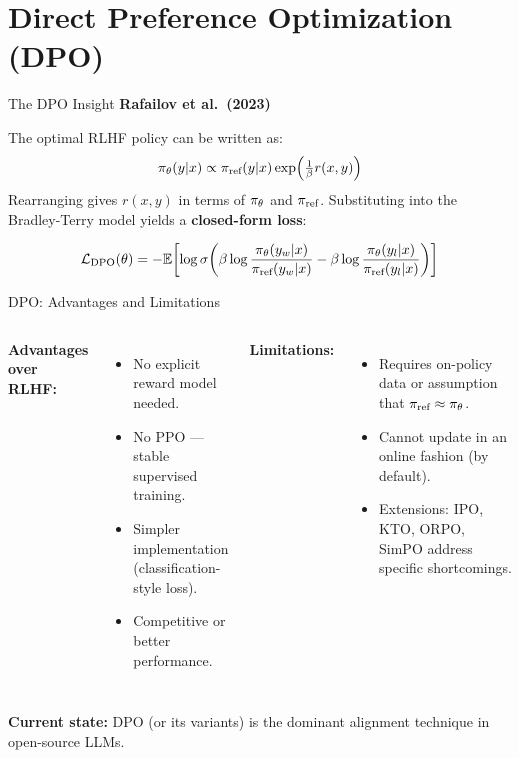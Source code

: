 \documentclass[aspectratio=169,10pt]{beamer}
\begin{document}
\section{Direct Preference Optimization (DPO)}

\begin{frame}{The DPO Insight}
  \textbf{Rafailov et al.\ (2023)}~\cite{rafailov2023direct}
  \vspace{0.4em}
  \begin{tcolorbox}[hitbox, title=Key Insight]
    The optimal RLHF policy can be written as:
    \[
      \pi_\theta(y|x) \propto \pi_{\text{ref}}(y|x)\exp\!\left(\tfrac{1}{\beta}r(x,y)\right)
    \]
    Rearranging gives $r(x,y)$ in terms of $\pi_\theta$ and $\pi_{\text{ref}}$.
    Substituting into the Bradley-Terry model yields a \textbf{closed-form loss}:
  \end{tcolorbox}
  \vspace{0.3em}
  \begin{tcolorbox}[hitbox, title=DPO Loss]
    \[
      \mathcal{L}_{\mathrm{DPO}}(\theta) = -\mathbb{E}\!\left[
        \log \sigma\!\left(
          \beta\log\frac{\pi_\theta(y_w|x)}{\pi_{\text{ref}}(y_w|x)}
          - \beta\log\frac{\pi_\theta(y_l|x)}{\pi_{\text{ref}}(y_l|x)}
        \right)
      \right]
    \]
  \end{tcolorbox}
\end{frame}

\begin{frame}{DPO: Advantages and Limitations}
  \begin{columns}[T]
      \textbf{Advantages over RLHF:}
      \begin{itemize}
        \item No explicit reward model needed.
        \item No PPO — stable supervised training.
        \item Simpler implementation (classification-style loss).
        \item Competitive or better performance.
      \end{itemize}
      \textbf{Limitations:}
      \begin{itemize}
        \item Requires on-policy data or assumption that $\pi_{\text{ref}} \approx \pi_\theta$.
        \item Cannot update in an online fashion (by default).
        \item Extensions: IPO, KTO, ORPO, SimPO address specific shortcomings.
      \end{itemize}
  \end{columns}
  \vspace{0.5em}
  \textbf{Current state:} DPO (or its variants) is the dominant alignment technique in open-source LLMs.
\end{frame}
\end{document}
